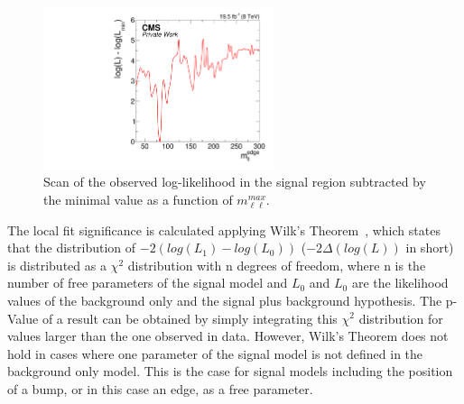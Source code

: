 \begin{figure}[htbp]
\centering
  \includegraphics[width=0.6\textwidth]{plots/results/fit/signal.pdf}
\caption{Scan of the observed log-likelihood in the signal region subtracted by the minimal value as a function of $m_{\ell\ell}^{max}$.}
\label{fig:fit:likelihoodScan}
\end{figure}

The local fit significance is calculated applying Wilk's Theorem~\cite{wilks1938}, which states that the distribution of $-2(log(L_1)-log(L_0))$ ($-2\Delta(log(L))$ in short) is distributed as a $\chi^2$ distribution with n degrees of freedom, where n is the number of free parameters of the signal model and $L_0$ and $L_0$ are the likelihood values of the background only and the signal plus background hypothesis. The p-Value of a result can be obtained by simply integrating this $\chi^2$ distribution for values larger than the one observed in data. However, Wilk's Theorem does not hold in cases where one parameter of the signal model is not defined in the background only model. This is the case for signal models including the position of a bump, or in this case an edge, as a free parameter. 

